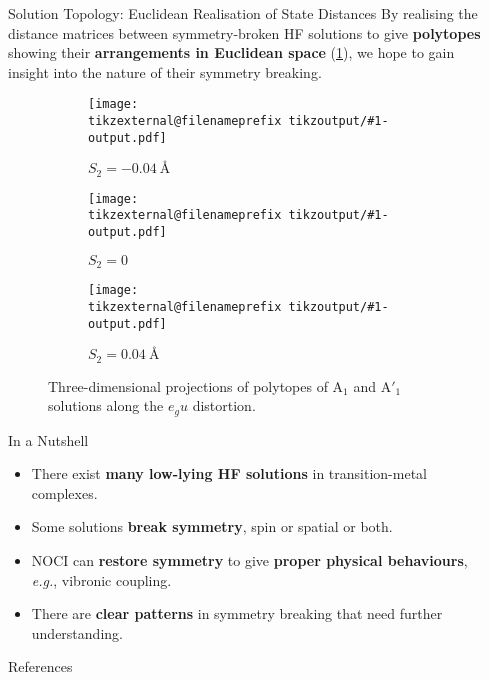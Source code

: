 \documentclass[final, xcolor={svgnames}]{beamer}
\makeatletter
\newif\iftikzex
\newcommand*{\useexternalfile}[1]{%
		\iftikzex
			\tikzsetnextfilename{tikzoutput/#1-output}%
			\scalebox{1}{}
		\else
			\texttt{[image: \\tikzexternal@filenameprefix tikzoutput/\#1-output.pdf]}
		\fi
	}
\newlength{\sepwidth}
\newlength{\colwidth}
\newcommand{\separatorcolumn}{\begin{column}{\sepwidth}\end{column}}
\makeatother
\begin{document}
\begin{frame}[t]
\begin{columns}[t]
\begin{column}{\colwidth}
		\begin{block}{Solution Topology: Euclidean Realisation of State Distances}
			By realising the distance matrices between symmetry-broken HF solutions to give \textbf{\color{Blue} polytopes} showing their \textbf{\color{red} arrangements in Euclidean space} (\cref{fig:AAdashpolytopes}), we hope to gain insight into the nature of their symmetry breaking.
			
			\begin{figure}
				\begin{subfigure}[b]{0.3\textwidth}
					\centering
					\useexternalfile{AAdashpolytope.Egu.elongation.g8}
					\caption{$S_2 = \SI{-0.04}{\angstrom}$}
				\end{subfigure}
				\hfill
				\begin{subfigure}[b]{0.3\textwidth}
					\centering
					\useexternalfile{AAdashpolytope.Egu.compression.g0}
					\caption{$S_2 = 0$}
				\end{subfigure}
				\hfill
				\begin{subfigure}[b]{0.3\textwidth}
					\centering
					\useexternalfile{AAdashpolytope.Egu.compression.g8}
					\caption{$S_2 = \SI{0.04}{\angstrom}$}
				\end{subfigure}
				\caption{Three-dimensional projections of polytopes of $\mathrm{A}_1$ and $\mathrm{A}'_1$ solutions along the $e_{g}u$ distortion.}
				\label{fig:AAdashpolytopes}
			\end{figure}
		\end{block}
	
		\begin{alertblock}{In a Nutshell}
			\begin{itemize}
				\item There exist \textbf{\color{DarkGreen} many low-lying HF solutions} in transition-metal complexes.
				\item Some solutions \textbf{\color{DarkGreen} break symmetry}, spin or spatial or both.
				\item NOCI can \textbf{\color{DarkGreen} restore symmetry} to give \textbf{\color{DarkGreen} proper physical behaviours}, \textit{e.g.}, vibronic coupling.
				\item There are \textbf{\color{DarkGreen} clear patterns} in symmetry breaking that need further understanding.
			\end{itemize}
		\end{alertblock}
	
		\begin{block}{References}
			
			\AtNextBibliography{\footnotesize}
			\nocite{*}
			\printbibliography[title=none]
			
		\end{block}
	
	\end{column}
	
	\separatorcolumn
\end{columns}
\end{frame}
\end{document}
